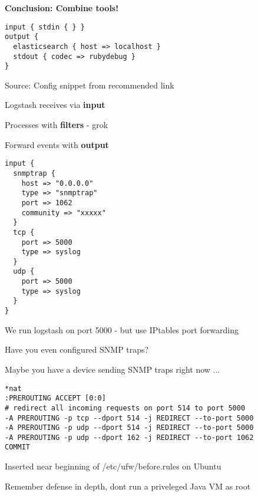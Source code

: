 \documentclass[20pt,landscape,a4paper,footrule]{foils}
\begin{document}
\vskip 2cm
\centerline{\bf\Large Conclusion: Combine tools!}



\begin{verbatim}
input { stdin { } }
output {
  elasticsearch { host => localhost }
  stdout { codec => rubydebug }
}
\end{verbatim}


Source:
Config snippet from recommended link\\
{\small{}}

\begin{list2}
\item Logstash receives via {\bf input}
\item Processes with {\bf filters} - grok
\item Forward events with {\bf output}
\end{list2}


{\footnotesize
\begin{verbatim}
input {
  snmptrap {
    host => "0.0.0.0"
    type => "snmptrap"
    port => 1062
    community => "xxxxx"
  }
  tcp {
    port => 5000
    type => syslog
  }
  udp {
    port => 5000
    type => syslog
  }
}
\end{verbatim}
}

\begin{list2}
\item We run logstash on port 5000 - but use IPtables port forwarding
\end{list2}

\centerline{Have you even configured SNMP traps?}

Maybe you have a device sending SNMP traps right now ...


{\footnotesize
\begin{verbatim}
*nat
:PREROUTING ACCEPT [0:0]
# redirect all incoming requests on port 514 to port 5000
-A PREROUTING -p tcp --dport 514 -j REDIRECT --to-port 5000
-A PREROUTING -p udp --dport 514 -j REDIRECT --to-port 5000
-A PREROUTING -p udp --dport 162 -j REDIRECT --to-port 1062
COMMIT
\end{verbatim}
}

\centerline{Inserted near beginning of /etc/ufw/before.rules on Ubuntu}

Remember defense in depth, dont run a priveleged Java VM as root \smiley
\end{document}

